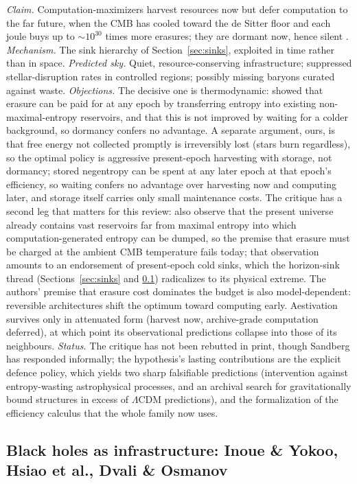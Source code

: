 \documentclass[11pt]{article}
\begin{document}
\emph{Claim.} Computation-maximizers harvest resources now but defer computation to the far future, when the CMB has cooled toward the de Sitter floor and each joule buys up to $\sim10^{30}$ times more erasures; they are dormant now, hence silent \citep{Sandberg2016}.
\emph{Mechanism.} The sink hierarchy of Section~\ref{sec:sinks}, exploited in time rather than in space.
\emph{Predicted sky.} Quiet, resource-conserving infrastructure; suppressed stellar-disruption rates in controlled regions; possibly missing baryons curated against waste.
\emph{Objections.} The decisive one is thermodynamic: \citet{Bennett2019} showed that erasure can be paid for at any epoch by transferring entropy into existing non-maximal-entropy reservoirs, and that this is not improved by waiting for a colder background, so dormancy confers no advantage. A separate argument, ours, is that free energy not collected promptly is irreversibly lost (stars burn regardless), so the optimal policy is aggressive present-epoch harvesting with storage, not dormancy; stored negentropy can be spent at any later epoch at that epoch's efficiency, so waiting confers no advantage over harvesting now and computing later, and storage itself carries only small maintenance costs. The critique has a second leg that matters for this review: \citet{Bennett2019} also observe that the present universe already contains vast reservoirs far from maximal entropy into which computation-generated entropy can be dumped, so the premise that erasure must be charged at the ambient CMB temperature fails today; that observation amounts to an endorsement of present-epoch cold sinks, which the horizon-sink thread (Sections~\ref{sec:sinks} and \ref{sec:bhinfra}) radicalizes to its physical extreme. The authors' premise that erasure cost dominates the budget is also model-dependent: reversible architectures shift the optimum toward computing early. Aestivation survives only in attenuated form (harvest now, archive-grade computation deferred), at which point its observational predictions collapse into those of its neighbours.
\emph{Status.} The critique has not been rebutted in print, though Sandberg has responded informally; the hypothesis's lasting contributions are the explicit defence policy, which yields two sharp falsifiable predictions (intervention against entropy-wasting astrophysical processes, and an archival search for gravitationally bound structures in excess of $\Lambda$CDM predictions), and the formalization of the efficiency calculus that the whole family now uses.

\subsection{Black holes as infrastructure: Inoue \& Yokoo, Hsiao et al., Dvali \& Osmanov}
\label{sec:bhinfra}
\end{document}
